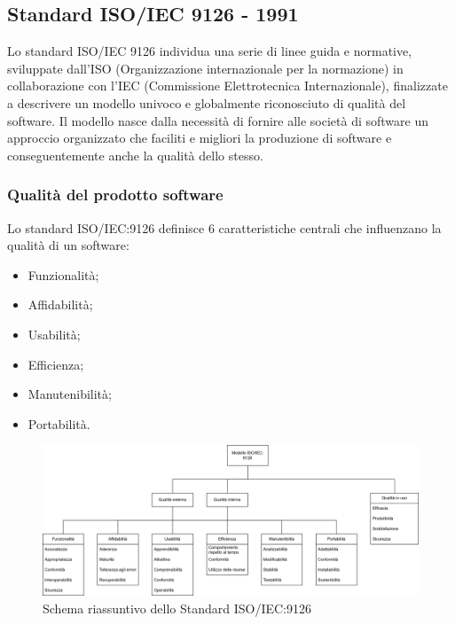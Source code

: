 \documentclass[10pt]{article}
\begin{document}
\begin{justify}
    \subsection{Standard ISO/IEC 9126 - 1991}
    \label{standard_9126}
    Lo standard ISO/IEC 9126 individua una serie di linee guida e normative, sviluppate dall'ISO (Organizzazione internazionale per la normazione) in collaborazione con l'IEC (Commissione Elettrotecnica Internazionale), finalizzate a descrivere un modello univoco e globalmente riconosciuto di qualità del software. Il modello nasce dalla necessità di fornire alle società di software un approccio organizzato che faciliti e migliori la produzione di software e conseguentemente anche la qualità dello stesso.

        \subsubsection{Qualità del prodotto software}
        Lo standard ISO/IEC:9126 definisce 6 caratteristiche centrali che influenzano la qualità di un software:
        \begin{itemize}
            \item Funzionalità;
            \item Affidabilità;
            \item Usabilità;
            \item Efficienza;
            \item Manutenibilità;
            \item Portabilità.
        \end{itemize}

        \begin{figure}[H]
        \centering
        \includegraphics[width=1\textwidth]{Standard9126.png}
        \caption{Schema riassuntivo dello Standard ISO/IEC:9126}
        \end{figure}


\end{justify}
\end{document}
